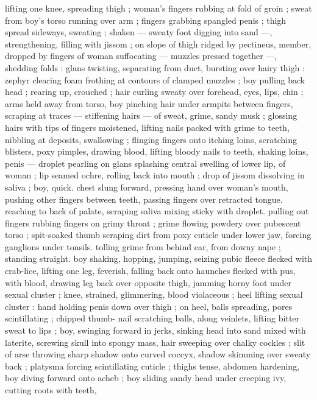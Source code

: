 lifting one knee, spreading thigh ; woman's fingers rubbing at fold of
groin ; sweat from boy's torso running over arm ; fingers grabbing
spangled penis ; thigh spread sideways, sweating ; shaken --- sweaty
foot digging into sand ---, strengthening, filling with jissom ; on
slope of thigh ridged by pectineus, member, dropped by fingers of
woman suffocating --- muzzles pressed together ---, shedding folds
: glans twisting, separating from duct, bursting over hairy thigh :
zephyr clearing foam frothing at contours of clamped muzzles ; boy
pulling back head ; rearing up, crouched ; hair curling sweaty over
forehead, eyes, lips, chin ; arms held away from torso, boy pinching
hair under armpits between fingers, scraping at traces --- stiffening
hairs --- of sweat, grime, sandy musk ; glossing hairs with tips of
fingers moistened, lifting nails packed with grime to teeth, nibbling
at deposits, swallowing ; flinging fingers onto itching loins,
scratching blisters, poxy pimples, drawing blood, lifting bloody nails
to teeth, shaking loins, penis --- droplet pearling on glans splashing
central swelling of lower lip, of woman ; lip seamed ochre, rolling
back into mouth ; drop of jissom dissolving in saliva ; boy, quick.
chest slung forward, pressing hand over woman's mouth, pushing
other fingers between teeth, passing fingers over retracted tongue.
reaching to back of palate, scraping saliva mixing sticky with droplet.
pulling out fingers rubbing fingers on grimy throat ; grime flowing
powdery over pubescent torso ; spit-soaked thumb scraping dirt
from poxy cuticle under lower jaw, forcing ganglions under tonsils.
tolling grime from behind ear, from downy nape ; standing straight.
boy shaking, hopping, jumping, seizing pubic fleece flecked with
crab-lice, lifting one leg, feverish, falling back onto haunches flecked
with pus, with blood, drawing leg back over opposite thigh, jamming
horny foot under sexual cluster ; knee, strained, glimmering, blood
violaceous ; heel lifting sexual cluster : hand holding penis down over
thigh ; on heel, balls spreading, pores scintillating ; chipped thumb-
nail scratching balls, along veinlets, lifting bitter sweat to lips ; boy,
swinging forward in jerks, sinking head into sand mixed with laterite,
screwing skull into spongy mass, hair sweeping over chalky cockles
; slit of arse throwing sharp shadow onto curved coccyx, shadow
skimming over sweaty back ; platysma forcing scintillating cuticle ;
thighs tense, abdomen hardening, boy diving forward onto acheb ;
boy sliding sandy head under creeping ivy, cutting roots with teeth,
